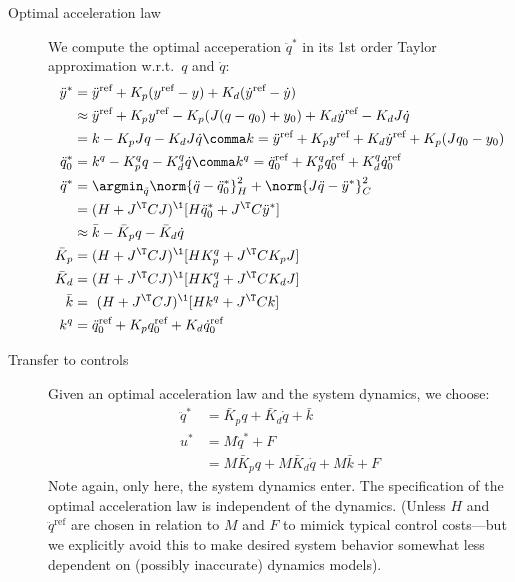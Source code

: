 \documentclass[10pt,fleqn,twoside]{article}
\newcommand{\rf}{{\text{ref}}}
\begin{document}
\begin{description}
\item[Optimal acceleration law] We compute the optimal acceperation
  $\ddot q^*$ in its 1st order Taylor approximation w.r.t.\ $q$ and
  $\dot q$:
\begin{align}
\ddot y^*
 &= \ddot y^\rf + K_p(y^\rf-y) + K_d (\dot y^\rf -\dot y) \\
 &\approx \ddot y^\rf + K_p y^\rf - K_p (J(q-q_0)+y_0) + K_d \dot y^\rf - K_d J \dot q \\
 &= k - K_p J q - K_d J \dot q \comma k = \ddot y^\rf + K_p y^\rf+ K_d \dot y^\rf + K_p (J q_0 - y_0) \\
\ddot q_0^*
 &= k^q - K^q_p q - K^q_d \dot q
\comma k^q = \ddot q_0^\rf + K^q_p q_0^\rf+ K^q_d \dot q_0^\rf \\
\ddot q^*
 &= \argmin_{\ddot q} \norm{\ddot q - \ddot q_0^*}^2_H + \norm{J \ddot q - \ddot y^*}^2_C \\
 &= (H + J^\T C J)^\1 [H \ddot q_0^* + J^\T C \ddot y^*] \\
 &\approx \bar k - \bar K_p q - \bar K_d \dot q  \label{eqProjGains}\\
\bar K_p
 &= (H + J^\T C J)^\1 [H K^q_p + J^\T C K_p J] \\
\bar K_d
 &= (H + J^\T C J)^\1 [H K^q_d + J^\T C K_d J] \\
\bar k
 &= ~ (H + J^\T C J)^\1 [H k^q + J^\T C k] \\
k^q
 &= \ddot q_0^\rf + K_p q_0^\rf+ K_d \dot q_0^\rf
\end{align}


\item[Transfer to controls] Given an optimal acceleration law and the
  system dynamics, we choose:
\begin{align}
\ddot q^*
 &= \bar K_p q + \bar K_d \dot q + \bar k \\
u^*
 &= M \ddot q^* + F \\
 &= M \bar K_p q + M \bar K_d \dot q + M \bar k + F
\end{align}
Note again, only here, the system dynamics enter. The specification of
the optimal acceleration law is independent of the dynamics. (Unless
$H$ and $\ddot q^\rf$ are chosen in relation to $M$ and $F$ to mimick
typical control costs---but we explicitly avoid this to make desired
system behavior somewhat less dependent on (possibly inaccurate)
dynamics models).



\end{description}
\end{document}
